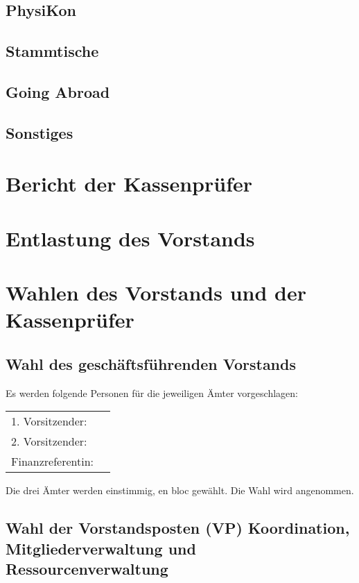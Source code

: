 \documentclass[
  paper=a4,
  fontsize=12pt,
  parskip=half,
  headinclude=true,
]{scrartcl}
\begin{document}
\subsection{PhysiKon}
\subsection{Stammtische}
\subsection{Going Abroad}
\subsection{Sonstiges}

\section{Bericht der Kassenprüfer}

\section{Entlastung des Vorstands}

\section{Wahlen des Vorstands und der Kassenprüfer}


\subsection{Wahl des geschäftsführenden Vorstands}

Es werden folgende Personen für die jeweiligen Ämter vorgeschlagen:

\begin{tabular}{l l}
  1. Vorsitzender: & \\
  2. Vorsitzender: & \\
  Finanzreferentin: & \\
\end{tabular}

Die drei Ämter werden einstimmig, en bloc gewählt.
Die Wahl wird angenommen.

\subsection{Wahl der Vorstandsposten (VP) Koordination, Mitgliederverwaltung und Ressourcenverwaltung}
\end{document}
